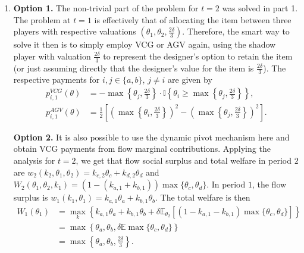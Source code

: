 \documentclass[a4paper]{article}
\begin{document}
\begin{enumerate}
		\item \textbf{Option 1.} The non-trivial part of the problem for $t=2$ was solved in part 1. The problem at $t=1$ is effectively that of allocating the item between three players with respective valuations $(\theta_1, \theta_2, \frac{2\delta}{3})$. Therefore, the smart way to solve it then is to simply employ VCG or AGV again, using the shadow player with valuation $\frac{2\delta}{3}$ to represent the designer's option to retain the item (or just assuming directly that the designer's value for the item is $\frac{2\delta}{3}$). The respective payments for $i,j \in \{a,b\}$, $j\neq i$ are given by
		\begin{align*}
			p^{VCG}_{i,1} (\theta) &= -\max \left\{\theta_j, \frac{2\delta}{3}\right\} \cdot \mathbb{I} \left\{ \theta_i \geq \max \left\{\theta_j, \frac{2\delta}{3}\right\} \right\},
			\\
			p^{AGV}_{i,1} (\theta) &= \frac{1}{2} \left[ \left(\max \left\{\theta_i, \frac{2\delta}{3}\right\}\right)^2 - \left(\max \left\{\theta_j, \frac{2\delta}{3}\right\}\right)^2 \right].
		\end{align*}
	
		\textbf{Option 2.} It is also possible to use the dynamic pivot mechanism here and obtain VCG payments from flow marginal contributions. Applying the analysis for $t=2$, we get that flow social surplus and total welfare in period $2$ are $w_2(k_2,\theta_1,\theta_2) = k_{c,2} \theta_c + k_{d,2} \theta_d$ and $W_2(\theta_1,\theta_2,k_1) = (1-(k_{a,1}+k_{b,1})) \max \{\theta_c,\theta_d\}$. In period $1$, the flow surplus is $w_1(k_1,\theta_1) = k_{a,1} \theta_a + k_{b,1} \theta_b$. The total welfare is then 
		\begin{align*}
			W_1(\theta_1) &= \max_k \left\{ k_{a,1} \theta_a + k_{b,1} \theta_b + \delta \mathbb{E}_{\theta_2} \left[(1-k_{a,1}-k_{b,1}) \max \{\theta_c,\theta_d\} \right] \right\}
			\\
			&= \max \left\{ \theta_a, \theta_b, \delta \mathbb{E} \max \{\theta_c,\theta_d\} \right\}
			\\
			&= \max \left\{ \theta_a, \theta_b, \frac{2\delta}{3} \right\}.
		\end{align*}
		

\end{enumerate}
\end{document}
